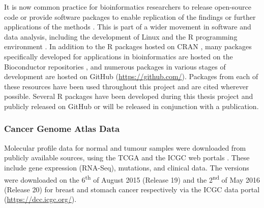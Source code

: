 It is now common practice for \gls{bioinformatics} researchers to release open-source code or provide software packages to enable replication of the findings or further applications of the methods \citep{Stajich2006}. This is part of a wider movement in software and data analysis, including the development of Linux and the R programming environment \citep{R_core}. In addition to the R packages hosted on \gls{CRAN} \citep{CRAN}, many packages specifically developed for applications in \gls{bioinformatics} are hosted on the Bioconductor repositories \citep{Gentleman2004}, and numerous packages in various stages of development are hosted on GitHub (\url{https://github.com/}). Packages from each of these resources have been used throughout this project and are cited wherever possible. Several R packages have been developed during this thesis project and publicly released on GitHub or will be released in conjunction with a publication.

\subsubsection{Cancer Genome Atlas Data}
Molecular profile data for normal and tumour samples were downloaded from publicly available sources, using the \gls{TCGA} \citep{TCGA2017web} and the \gls{ICGC} web portals \citep{ICGC2011}. These include \gls{gene expression} (\gls{RNA-Seq}),  \glspl{mutation}, and clinical data. The versions were downloaded on the 6\textsuperscript{th} of August  2015 (Release 19) and the 2\textsuperscript{nd} of May 2016 (Release 20) for breast and stomach cancer respectively via the \gls{ICGC} data portal (\url{https://dcc.icgc.org/}).


